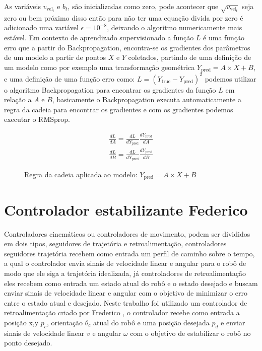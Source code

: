 As variáveis $v_{\text{vel}_t}$ e  $b_t$, são inicializadas como zero, pode acontecer
que  $\sqrt{v_{\text{vel}_t}}$ seja zero ou bem próximo disso então para não ter uma equação
divida por zero é adicionado uma variável $\epsilon =10^{-8}$, deixando o algoritmo numericamente
mais estável. Em contexto de aprendizado supervisionado a função $L$ é uma função erro que a
partir do Backpropagation, encontra-se os gradientes dos parâmetros de um modelo a partir
de pontos $X$ e $Y$ coletados, partindo de  uma definição de um modelo como por exemplo uma
transformação geométrica $Y_{\text{pred}}= A \times X + B$, e uma definição de uma função
erro como: $L=(Y_{\text{true}}- Y_{\text{pred}})^2$ podemos utilizar o algoritmo
Backpropagation para encontrar os gradientes da função $L$ em relação a $A$
e  $B$, basicamente o Backpropagation executa automaticamente a regra da cadeia
para encontrar os gradientes e com os gradientes podemos executar o RMSprop.

\begin{figure}[H]
    \begin{align*}
        \frac{dL}{dA } = \frac{dL}{dY_{\text{pred}} } \frac{dY_{\text{pred}}}{dA}  \\
        \frac{dL}{dB } = \frac{dL}{dY_{\text{pred}} } \frac{dY_{\text{pred}}}{dB} 
    \end{align*}
    \caption{Regra da cadeia aplicada ao modelo: $Y_{\text{pred}}= A \times X + B$ }
\end{figure}



\section{Controlador estabilizante Federico}
Controladores cinemáticos ou controladores de movimento, podem ser 
divididos em dois tipos, seguidores de trajetória e retroalimentação,
controladores seguidores trajetória recebem como entrada um perfil
de caminho sobre o tempo, a qual o controlador envia sinais de
velocidade linear e angular para o robô de modo que ele siga a
trajetória idealizada, já controladores de retroalimentação
eles recebem como entrada um estado atual do robô e o estado desejado
e buscam enviar sinais de velocidade linear e angular com o objetivo
de minimizar o erro entre o estado atual e desejado. Neste trabalho
foi utilizado um controlador de retroalimentação criado por Frederico
\cite{vieira2006controle}, o controlador recebe como entrada a posição
x,y $p_c$, orientação $\theta_c$ atual do robô e uma posição desejada $p_d$
e enviar sinais de velocidade linear $v$ e angular $\omega$ com o
objetivo de estabilizar o robô no ponto desejado.

